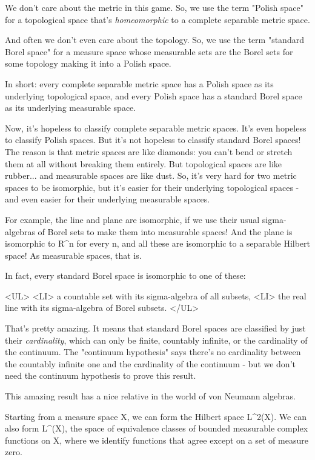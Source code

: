 We don't care about the metric in this game.  So, we use the term
"Polish space" for a topological space that's \emph{homeomorphic} to a
complete separable metric space.

And often we don't even care about the topology.  So, we use the
term "standard Borel space" for a measure space whose measurable
sets are the Borel sets for some topology making it into a Polish 
space. 

In short: every complete separable metric space has a Polish space as
its underlying topological space, and every Polish space has a 
standard Borel space as its underlying measurable space.

Now, it's hopeless to classify complete separable metric spaces.
It's even hopeless to classify Polish spaces.  But it's not
hopeless to classify standard Borel spaces!  The reason is that metric
spaces are like diamonds: you can't bend or stretch them at all without
breaking them entirely.  But topological spaces are like rubber... and
measurable spaces are like dust.  So, it's very hard for two metric
spaces to be isomorphic, but it's easier for their underlying
topological spaces - and even easier for their underlying measurable
spaces.  

For example, the line and plane are isomorphic, if we use their 
usual sigma-algebras of Borel sets to make them into measurable
spaces!   And the plane is isomorphic to R^{n} for every n, and all
these are isomorphic to a separable Hilbert space!  As measurable
spaces, that is.

In fact, every standard Borel space is isomorphic to one of these:

<UL>
<LI>
a countable set with its sigma-algebra of all subsets,
<LI>
the real line with its sigma-algebra of Borel subsets.
</UL>

That's pretty amazing.   It means that standard Borel spaces are
classified by just their \emph{cardinality}, which can only be finite,
countably infinite, or the cardinality of the continuum.  The "continuum
hypothesis" says there's no cardinality between the countably infinite
one and the cardinality of the continuum - but we don't need the
continuum hypothesis to prove this result.

This amazing result has a nice relative in the world of von Neumann
algebras.

Starting from a measure space X, we can form the Hilbert space
L^{2}(X).  We can also form L^{\infty }(X), the space
of equivalence classes of bounded measurable complex functions on X,
where we identify functions that agree except on a set of measure
zero.

